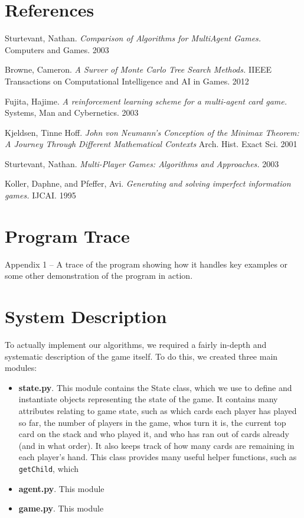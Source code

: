\documentclass[11pt]{article}
\begin{document}
\section{References}

\begin{thebibliography}{5}

	Sturtevant, Nathan.
	\emph{Comparison of Algorithms for MultiAgent Games.}
	Computers and Games.
	2003

	Browne, Cameron.
	\emph{A Surver of Monte Carlo Tree Search Methods.}
	IIEEE Transactions on Computational Intelligence and AI in Games. 
	2012

	Fujita, Hajime.
	\emph{A reinforcement learning scheme for a multi-agent card game.}
	Systems, Man and Cybernetics.
	2003

	Kjeldsen, Tinne Hoff.
	\emph{John von Neumann’s Conception of the Minimax Theorem: A Journey Through Different Mathematical Contexts}
	Arch. Hist. Exact Sci.
	2001
	
	Sturtevant, Nathan.
	\emph{Multi-Player Games: Algorithms and Approaches.}
	2003
	
	Koller, Daphne, and Pfeffer, Avi.
	\emph{Generating and solving imperfect information games.}
	IJCAI.
	1995
	
\end{thebibliography}

\appendix

\section{Program Trace}

Appendix 1 – A trace of the program showing how it handles key examples or some other demonstration of the program in action.

\section{System Description}

To actually implement our algorithms, we required a fairly in-depth and systematic description of the game itself. To do this, we created three main modules:
\begin{itemize}
  \item \textbf{state.py}. This module contains the State class, which we use to define and instantiate objects representing the state of the game. It contains many attributes relating to game state, such as which cards each player has played so far, the number of players in the game, whos turn it is, the current top card on the stack and who played it, and who has ran out of cards already (and in what order). It also keeps track of how many cards are remaining in each player's hand. This class provides many useful helper functions, such as \verb|getChild|, which 
  \item \textbf{agent.py}. This module
  \item \textbf{game.py}. This module
\end{itemize}
\end{document}
